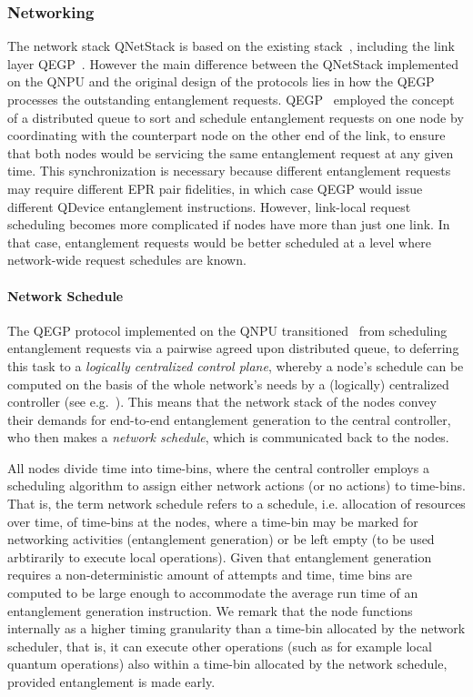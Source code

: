 \subsubsection{Networking}
\label{qnodeos:sec:arch-networking}

The network stack \ac{QNetStack} is based on the existing stack~\cite{dahlberg_2019_egp}, including the link layer \ac{QEGP}~\cite{dahlberg_2019_egp}.
However the main difference between the \ac{QNetStack} implemented on the \ac{QNPU} and the original design of the protocols lies in how the \ac{QEGP} processes the outstanding entanglement requests. \ac{QEGP}~\cite{dahlberg_2019_egp} employed the concept of a distributed queue to sort and schedule entanglement requests on one node by coordinating with the counterpart node on the other end of the link, to ensure that both nodes would be servicing the same entanglement request at any given time. This synchronization is necessary because different entanglement requests may require different \ac{EPR} pair fidelities, in which case \ac{QEGP} would issue different \ac{QDevice} entanglement instructions. However, link-local request scheduling becomes more complicated if nodes have more than just one link. In that case, entanglement requests would be better scheduled at a level where network-wide request schedules are known. 

\paragraph{Network Schedule}
The \ac{QEGP} protocol implemented on the \ac{QNPU} transitioned~\cite{pompili_2022_experimental} from scheduling entanglement requests via a pairwise agreed upon distributed queue, to deferring this task to a \emph{logically centralized control plane}, whereby a node's schedule can be computed on the basis of the whole network's needs by a (logically) centralized controller (see e.g.~\cite{skrzypczyk_2021_arch}). This means that the network stack of the nodes convey their demands for end-to-end entanglement generation to the central controller, who then makes a \emph{network schedule}, which is communicated back to the nodes. 

All nodes divide time into time-bins, where the central controller employs a scheduling algorithm to assign either network actions (or no actions) to time-bins. That is, the term network schedule refers to a schedule, i.e. allocation of resources over time, of time-bins at the nodes, where a time-bin may be marked for networking activities (entanglement generation) or be left empty (to be used arbtirarily to execute local operations). 
Given that entanglement generation requires a non-deterministic amount of attempts and time, time bins are computed to be large enough to accommodate the average run time of an entanglement generation instruction. 
We remark that the node functions internally as a higher timing granularity than a time-bin allocated by the network scheduler, that is, it can execute other operations (such as for example local quantum operations) also within a time-bin allocated by the network schedule, provided entanglement is made early.


